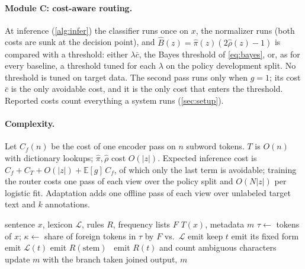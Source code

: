 \paragraph{Module C: cost-aware routing.}
At inference (\cref{alg:infer}) the classifier runs once on $x$, the normalizer runs (both costs are sunk at the decision point), and $\hat B(z)=\hat\pi(z)(2\hat\rho(z)-1)$ is compared with a threshold: either $\lambda\bar c$, the Bayes threshold of \cref{eq:bayes}, or, as for every baseline, a threshold tuned for each $\lambda$ on the policy development split. No threshold is tuned on target data. The second pass runs only when $g=1$; its cost $\bar c$ is the only avoidable cost, and it is the only cost that enters the threshold. Reported costs count everything a system runs (\cref{sec:setup}).

\paragraph{Complexity.}
Let $C_f(n)$ be the cost of one encoder pass on $n$ subword tokens. $T$ is $O(n)$ with dictionary lookups; $\hat\pi,\hat\rho$ cost $O(|z|)$. Expected inference cost is $C_f+C_T+O(|z|)+\mathbb E[g]\,C_f$, of which only the last term is avoidable; training the router costs one pass of each view over the policy split and $O(N|z|)$ per logistic fit. Adaptation adds one offline pass of each view over unlabeled target text and $k$ annotations.

\begin{algorithm}[t]
\small
\caption{Conservative normalization $T_{\rm cons}$}
\label{alg:norm}
\begin{algorithmic}[1]
\Require sentence $x$, lexicon $\mathcal L$, rules $R$, frequency lists $F$
\Ensure $T(x)$, metadata $m$
\State $\tau\gets$ tokens of $x$; $\kappa\gets$ share of foreign tokens in $\tau$ by $F$ vs.\ $\mathcal L$
   emit 
   keep $t$
   emit its fixed form
   emit $\mathcal L(t)$
   emit  $R(\text{stem})$
  \Else\ emit $R(t)$ and count ambiguous characters
  \EndIf
  \State update $m$ with the branch taken
\EndFor
\State \Return joined output, $m$
\end{algorithmic}
\end{algorithm}

